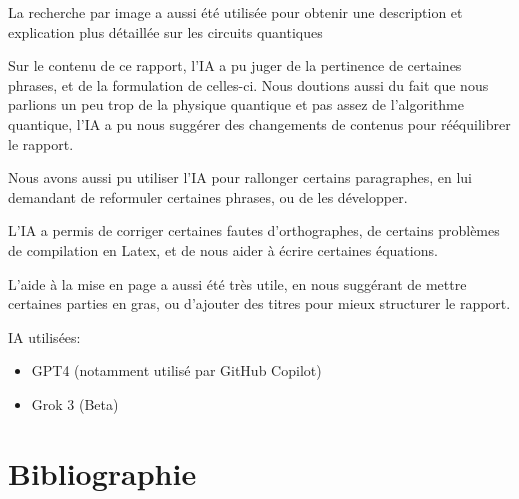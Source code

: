 \documentclass{article}
\begin{document}
La recherche par image a aussi été utilisée pour obtenir une description et explication plus détaillée sur les circuits quantiques

\medskip

Sur le contenu de ce rapport, l'IA a pu juger de la pertinence de certaines phrases, et de la formulation de celles-ci. Nous doutions aussi du fait que nous parlions un peu trop de la physique quantique et pas assez de l'algorithme quantique, l'IA a pu nous suggérer des changements de contenus pour rééquilibrer le rapport.

\medskip

Nous avons aussi pu utiliser l'IA pour rallonger certains paragraphes, en lui demandant de reformuler certaines phrases, ou de les développer.

L'IA a permis de corriger certaines fautes d'orthographes, de certains problèmes de compilation en Latex, et de nous aider à écrire certaines équations.

L'aide à la mise en page a aussi été très utile, en nous suggérant de mettre certaines parties en gras, ou d'ajouter des titres pour mieux structurer le rapport.

IA utilisées:
\begin{itemize}
  \item GPT4 (notamment utilisé par GitHub Copilot)
  \item Grok 3 (Beta)
\end{itemize}


\break\section{Bibliographie}
\printbibliography
\end{document}
